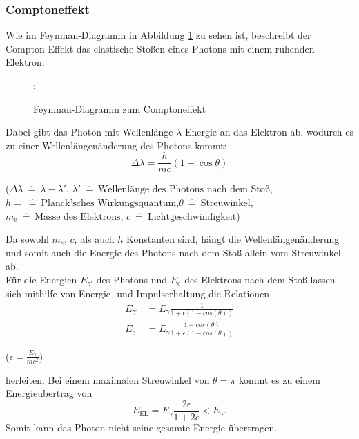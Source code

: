 \subsubsection{Comptoneffekt}
Wie im Feynman-Diagramm in Abbildung \ref{fig:compton} zu sehen ist, beschreibt der Compton-Effekt das elastische Stoßen eines Photons mit einem ruhenden Elektron.
\begin{figure}[H]
\centering
{};
\caption{Feynman-Diagramm zum Comptoneffekt}
\label{fig:compton}
\end{figure}
Dabei gibt das Photon mit Wellenlänge $\lambda$ Energie an das Elektron ab, wodurch es zu einer Wellenlängenänderung des Photons kommt:
\begin{equation}
  \Delta \lambda = \frac{h}{mc}\left( 1-\cos{\theta} \right)
\end{equation}
\begin{center}
    \tiny {($\Delta \lambda \: \hat{=} \: \lambda - \lambda '$, $ \lambda '\: \hat{=} \:\text{Wellenlänge des Photons nach dem Stoß}$, $h=\: \hat{=} \:\text{Planck'sches Wirkungsquantum}$,$\theta\: \hat{=} \:\text{Streuwinkel}$, $m_\text{e} \: \hat{=} \:\text{Masse des Elektrons}$, $c \: \hat{=} \: \text{Lichtgeschwindigkeit}$)}
\end{center}
Da sowohl $m_\text{e}$, $c$, als auch $h$ Konstanten sind, hängt die Wellenlängenänderung und somit auch die Energie des Photons nach dem Stoß allein vom Streuwinkel ab.\\
Für die Energien $E_{\gamma'}$ des Photons und $E_e$ des Elektrons nach dem Stoß lassen sich mithilfe von Energie- und Impulserhaltung die Relationen
\begin{align}
    E_{\gamma'} &= E_\gamma \frac{1}{1+\epsilon (1-cos(\theta))}
    \label{eqn:rueckstreu}\\
    E_e &= E_\gamma \frac{1-cos(\theta)}{1+\epsilon (1-cos(\theta))}
\end{align}
\begin{center}
    \tiny{($\epsilon = \frac{E_\gamma}{mc^2}$)}
\end{center}
herleiten. Bei einem maximalen Streuwinkel von $\theta = \pi$ kommt es zu einem Energieübertrag von
\begin{equation}
    E_\text{EL} = E_\gamma \frac{2 \epsilon}{1 + 2 \epsilon} < E_\gamma .
    \label{eqn:compton_kante}
\end{equation}
Somit kann das Photon nicht seine gesamte Energie übertragen.

